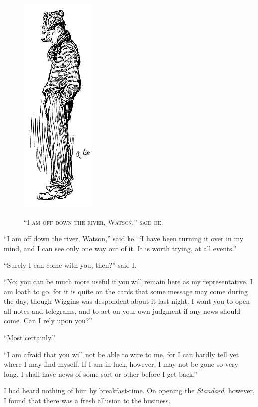 \documentclass[12pt,english,oneside]{book}
\newcommand{\noun}[1]{\textsc{#1}}
\begin{document}
%
\begin{figure}[htbp]
\noindent \begin{center}\includegraphics{images/sign410-sign-14.png}\end{center}

\noindent \begin{center}\noun{{}``I am off down the river, Watson,''
said he.}\end{center}
\end{figure}
{}``I am off down the river, Watson,'' said he. {}``I have been
turning it over in my mind, and I can see only one way out of it.
It is worth trying, at all events.''

{}``Surely I can come with you, then?'' said I.

{}``No; you can be much more useful if you will remain here as my
representative. I am loath to go, for it is quite on the cards that
some message may come during the day, though Wiggins was despondent
about it last night. I want you to open all notes and telegrams, and
to act on your own judgment if any news should come. Can I rely upon
you?''

{}``Most certainly.''

{}``I am afraid that you will not be able to wire to me, for I can
hardly tell yet where I may find myself. If I am in luck, however,
I may not be gone so very long. I shall have news of some sort or
other before I get back.''

I had heard nothing of him by breakfast-time. On opening the \emph{Standard},
however, I found that there was a fresh allusion to the business. 
\end{document}
